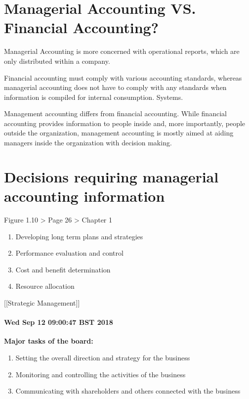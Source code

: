 \documentclass{article}
\begin{document}
\section{Managerial Accounting VS. Financial Accounting?}

Managerial Accounting is more concerned with operational reports, which are only distributed within a company.

Financial accounting must comply with various accounting standards, whereas managerial accounting does not have to comply with any standards when information is compiled for internal consumption. Systems.

Management accounting differs from financial accounting. While financial accounting provides information to people inside and, more importantly, people outside the organization, management accounting is mostly aimed at aiding managers inside the organization with decision making.

\clearpage

\section{Decisions requiring managerial accounting information}

\textsf{Figure 1.10 > Page 26 > Chapter 1}

\begin{enumerate}
\item Developing long term plans and strategies 
\item Performance evaluation and control
\item Cost and benefit determination
\item Resource allocation
\end{enumerate}

[[Strategic Management]]

\paragraph{Wed Sep 12 09:00:47 BST 2018}

\textbf{Major tasks of the board:}

\begin{enumerate}
\item Setting the overall direction and strategy for the business
\item Monitoring and controlling the activities of the business 
\item Communicating with shareholders and others connected with the business
\end{enumerate}
   
\end{document}
